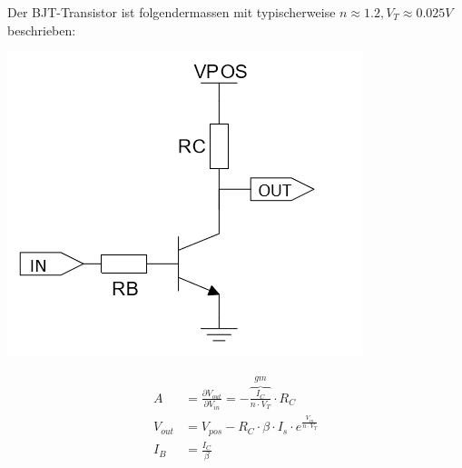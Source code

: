 \noindent Der BJT-Transistor ist folgendermassen mit typischerweise $n\approx1.2, V_T \approx0.025V$ beschrieben:\\
\begin{minipage}{0.20\textwidth}
	\includegraphics[width=\linewidth,keepaspectratio=true]{./Images/bjt}\label{abb:ü-kennlinie}
\end{minipage}%
\begin{minipage}{0.30\textwidth}
	\begin{align*}
		A &= \frac{\partial V_{out}}{\partial V_{in}} = -\overbrace{\frac{I_C}{n\cdot V_T}}^{gm}\cdot R_C  \\
		V_{out} &= V_{pos} - R_C\cdot\beta\cdot I_s\cdot e^{\frac{V_{in}}{n\cdot V_T}} \\
		I_B &= \frac{I_C}{\beta}
	\end{align*}
\end{minipage}


